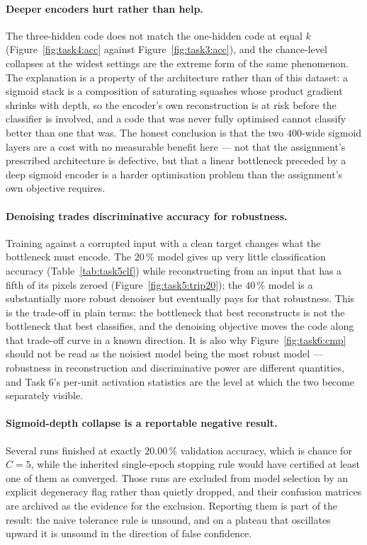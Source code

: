 \documentclass[11pt,a4paper]{article}
\begin{document}
\paragraph{Deeper encoders hurt rather than help.}
The three-hidden code does not match the one-hidden code at equal $k$ (Figure~\ref{fig:task4:acc}
against Figure~\ref{fig:task3:acc}), and the chance-level collapses at the widest settings are the
extreme form of the same phenomenon.  The explanation is a property of the architecture rather than
of this dataset: a sigmoid stack is a composition of saturating squashes whose product gradient
shrinks with depth, so the encoder's own reconstruction is at risk before the classifier is
involved, and a code that was never fully optimised cannot classify better than one that was.  The
honest conclusion is that the two $400$-wide sigmoid layers are a cost with no measurable benefit
here --- not that the assignment's prescribed architecture is defective, but that a linear bottleneck
preceded by a deep sigmoid encoder is a harder optimisation problem than the assignment's own
objective requires.

\paragraph{Denoising trades discriminative accuracy for robustness.}
Training against a corrupted input with a clean target changes what the bottleneck must encode.  The
$20\,\%$ model gives up very little classification accuracy (Table~\ref{tab:task5clf}) while
reconstructing from an input that has a fifth of its pixels zeroed (Figure~\ref{fig:task5:trip20});
the $40\,\%$ model is a substantially more robust denoiser but eventually pays for that robustness.
This is the trade-off in plain terms: the bottleneck that best reconstructs is not the bottleneck
that best classifies, and the denoising objective moves the code along that trade-off curve in a
known direction.  It is also why Figure~\ref{fig:task6:cmp} should not be read as the noisiest model
being the most robust model --- robustness in reconstruction and discriminative power are different
quantities, and Task 6's per-unit activation statistics are the level at which the two become
separately visible.

\paragraph{Sigmoid-depth collapse is a reportable negative result.}
Several runs finished at exactly $20.00\,\%$ validation accuracy, which is chance for $C=5$, while
the inherited single-epoch stopping rule would have certified at least one of them as converged.
Those runs are excluded from model selection by an explicit degeneracy flag rather than quietly
dropped, and their confusion matrices are archived as the evidence for the exclusion.  Reporting
them is part of the result: the naive tolerance rule is unsound, and on a plateau that oscillates
upward it is unsound in the direction of false confidence.
\end{document}
